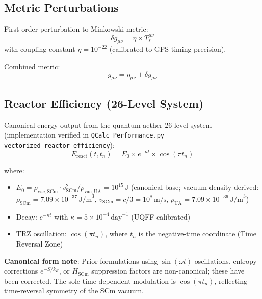 \documentclass[12pt,a4paper]{article}
\begin{document}
\subsection{Metric Perturbations}

First-order perturbation to Minkowski metric:
\begin{equation}
\delta g_{\mu\nu} = \eta \times T_s^{\mu\nu}
\label{eq:metric_pert}
\end{equation}
with coupling constant $\eta = 10^{-22}$ (calibrated to GPS timing precision).

Combined metric:
\begin{equation}
g_{\mu\nu} = \eta_{\mu\nu} + \delta g_{\mu\nu}
\label{eq:combined_metric}
\end{equation}

\subsection{Reactor Efficiency (26-Level System)}

Canonical energy output from the quantum-aether 26-level system (implementation verified in \texttt{QCalc\_Performance.py} \texttt{vectorized\_reactor\_efficiency}):
\begin{equation}
E_{\mathrm{react}}(t, t_n) = E_0 \times e^{-\kappa t} \times \cos(\pi t_n)
\label{eq:reactor_efficiency}
\end{equation}

where:
\begin{itemize}
    \item $E_0 = \rho_{\mathrm{vac,SCm}} \cdot v_{\mathrm{SCm}}^2 / \rho_{\mathrm{vac,UA}} = 10^{15}\,\text{J}$ (canonical base; vacuum-density derived: $\rho_{\mathrm{SCm}} = 7.09 \times 10^{-37}\,\text{J/m}^3$, $v_{\mathrm{SCm}} = c/3 = 10^8\,\text{m/s}$, $\rho_{\mathrm{UA}} = 7.09 \times 10^{-36}\,\text{J/m}^3$)
    \item Decay: $e^{-\kappa t}$ with $\kappa = 5 \times 10^{-4}\,\text{day}^{-1}$ (UQFF-calibrated)
    \item TRZ oscillation: $\cos(\pi t_n)$, where $t_n$ is the negative-time coordinate (Time Reversal Zone)
\end{itemize}

\textbf{Canonical form note}: Prior formulations using $\sin(\omega t)$ oscillations, entropy corrections $e^{-S/k_B}$, or $H_{\mathrm{SCm}}$ suppression factors are non-canonical; these have been corrected. The sole time-dependent modulation is $\cos(\pi t_n)$, reflecting time-reversal symmetry of the SCm vacuum.
\end{document}
